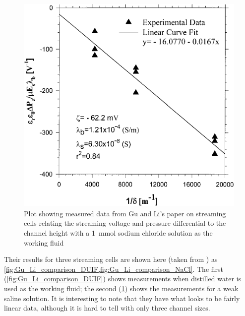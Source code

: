   \begin{figure}
      \centering
      \includegraphics{content/pt1/01-PowerHarvesting/graphics/GuLi_NaCl}
      \caption{\label{fig:Gu_Li_comparison_NaCl}Plot showing measured data from Gu and Li's paper on streaming cells relating the streaming voltage and pressure differential to the channel height with a \SI{1}{\milli\mole} sodium chloride solution as the working fluid}
  \end{figure}

  Their results for three streaming cells are shown here (taken from \cite{Gu2000}) as \cref{fig:Gu_Li_comparison_DUIF,fig:Gu_Li_comparison_NaCl}.
  The first (\cref{fig:Gu_Li_comparison_DUIF}) shows measurements when distilled water is used as the working fluid; the second (\cref{fig:Gu_Li_comparison_NaCl}) shows the measurements for a weak saline solution.
  It is interesting to note that they have what looks to be fairly linear data, although it is hard to tell with only three channel sizes.

